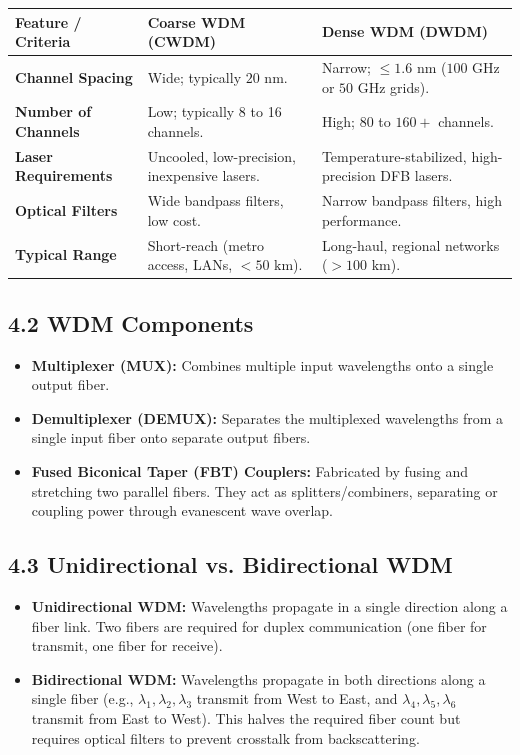 \begin{table}[H]
\centering
\begin{tabular}{|p{}|p{}|p{}|}
\hline
Feature / Criteria & Coarse WDM (CWDM) & Dense WDM (DWDM) \\
\hline
\textbf{Channel Spacing} & Wide; typically $20\text{ nm}$. & Narrow; $\le 1.6\text{ nm}$ ($100\text{ GHz}$ or $50\text{ GHz}$ grids). \\
\hline
\textbf{Number of Channels} & Low; typically 8 to 16 channels. & High; 80 to $160+$ channels. \\
\hline
\textbf{Laser Requirements} & Uncooled, low-precision, inexpensive lasers. & Temperature-stabilized, high-precision DFB lasers. \\
\hline
\textbf{Optical Filters} & Wide bandpass filters, low cost. & Narrow bandpass filters, high performance. \\
\hline
\textbf{Typical Range} & Short-reach (metro access, LANs, $< 50\text{ km}$). & Long-haul, regional networks ($> 100\text{ km}$). \\
\hline
\end{tabular}
\end{table}


\subsection{4.2 WDM Components}
\begin{itemize}
  \item   \textbf{Multiplexer (MUX):} Combines multiple input wavelengths onto a single output fiber.
  \item   \textbf{Demultiplexer (DEMUX):} Separates the multiplexed wavelengths from a single input fiber onto separate output fibers.
  \item   \textbf{Fused Biconical Taper (FBT) Couplers:} Fabricated by fusing and stretching two parallel fibers. They act as splitters/combiners, separating or coupling power through evanescent wave overlap.
\end{itemize}


\subsection{4.3 Unidirectional vs. Bidirectional WDM}
\begin{itemize}
  \item   \textbf{Unidirectional WDM:} Wavelengths propagate in a single direction along a fiber link. Two fibers are required for duplex communication (one fiber for transmit, one fiber for receive).
  \item   \textbf{Bidirectional WDM:} Wavelengths propagate in both directions along a single fiber (e.g., $\lambda_1, \lambda_2, \lambda_3$ transmit from West to East, and $\lambda_4, \lambda_5, \lambda_6$ transmit from East to West). This halves the required fiber count but requires optical filters to prevent crosstalk from backscattering.
\end{itemize}


